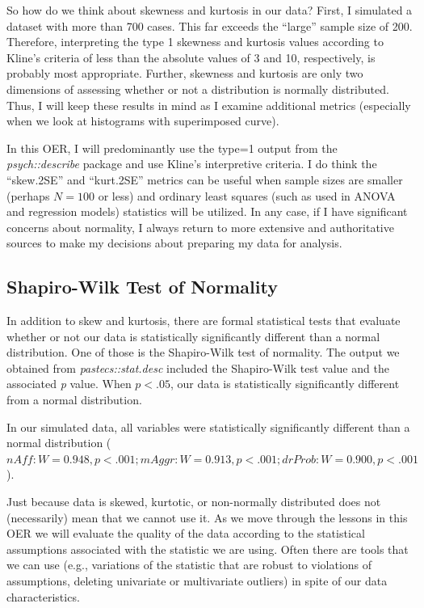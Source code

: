 \documentclass[
  11pt,
]{book}
\begin{document}
So how do we think about skewness and kurtosis in our data? First, I simulated a dataset with more than 700 cases. This far exceeds the ``large'' sample size of 200. Therefore, interpreting the type 1 skewness and kurtosis values according to Kline's \citeyearpar{kline_data_2016} criteria of less than the absolute values of 3 and 10, respectively, is probably most appropriate. Further, skewness and kurtosis are only two dimensions of assessing whether or not a distribution is normally distributed. Thus, I will keep these results in mind as I examine additional metrics (especially when we look at histograms with superimposed curve).

In this OER, I will predominantly use the type=1 output from the \emph{psych::describe} package and use Kline's \citeyearpar{kline_data_2016} interpretive criteria. I do think the ``skew.2SE'' and ``kurt.2SE'' metrics can be useful when sample sizes are smaller (perhaps \(N = 100\) or less) and ordinary least squares (such as used in ANOVA and regression models) statistics will be utilized. In any case, if I have significant concerns about normality, I always return to more extensive and authoritative sources to make my decisions about preparing my data for analysis.

\hypertarget{shapiro-wilk-test-of-normality}{%
\subsection{Shapiro-Wilk Test of Normality}\label{shapiro-wilk-test-of-normality}}

In addition to skew and kurtosis, there are formal statistical tests that evaluate whether or not our data is statistically significantly different than a normal distribution. One of those is the Shapiro-Wilk test of normality. The output we obtained from \emph{pastecs::stat.desc} included the Shapiro-Wilk test value and the associated \emph{p} value. When \(p < .05\), our data is statistically significantly different from a normal distribution.

In our simulated data, all variables were statistically significantly different than a normal distribution (\(nAff: W = 0.948, p < .001; mAggr: W = 0.913, p < .001; drProb: W = 0.900, p < .001\)).

Just because data is skewed, kurtotic, or non-normally distributed does not (necessarily) mean that we cannot use it. As we move through the lessons in this OER we will evaluate the quality of the data according to the statistical assumptions associated with the statistic we are using. Often there are tools that we can use (e.g., variations of the statistic that are robust to violations of assumptions, deleting univariate or multivariate outliers) in spite of our data characteristics.
\end{document}
